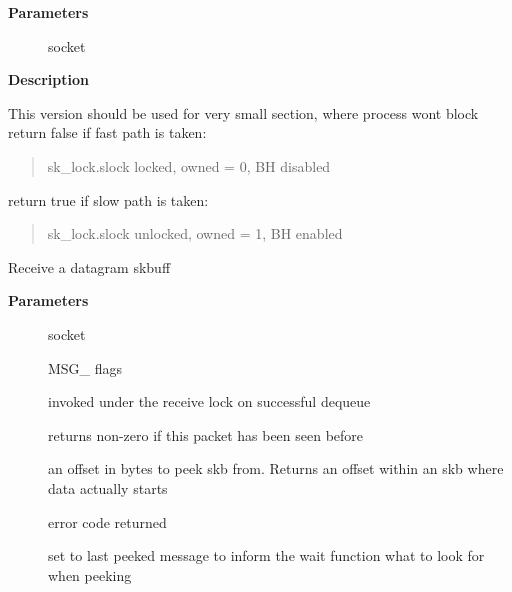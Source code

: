 \documentclass[a4paper,8pt,english]{sphinxmanual}
\begin{document}
\textbf{Parameters}
\begin{description}
\item[{}] \leavevmode
socket

\end{description}

\textbf{Description}

This version should be used for very small section, where process wont block
return false if fast path is taken:
\begin{quote}

sk\_lock.slock locked, owned = 0, BH disabled
\end{quote}

return true if slow path is taken:
\begin{quote}

sk\_lock.slock unlocked, owned = 1, BH enabled
\end{quote}

\begin{fulllineitems}
\label{networking/kapi:c.__skb_try_recv_datagram}
Receive a datagram skbuff

\end{fulllineitems}


\textbf{Parameters}
\begin{description}
\item[{}] \leavevmode
socket

\item[{}] \leavevmode
MSG\_ flags

\item[{}] \leavevmode
invoked under the receive lock on successful dequeue

\item[{}] \leavevmode
returns non-zero if this packet has been seen before

\item[{}] \leavevmode
an offset in bytes to peek skb from. Returns an offset
within an skb where data actually starts

\item[{}] \leavevmode
error code returned

\item[{}] \leavevmode
set to last peeked message to inform the wait function
what to look for when peeking

\end{description}
\end{document}
